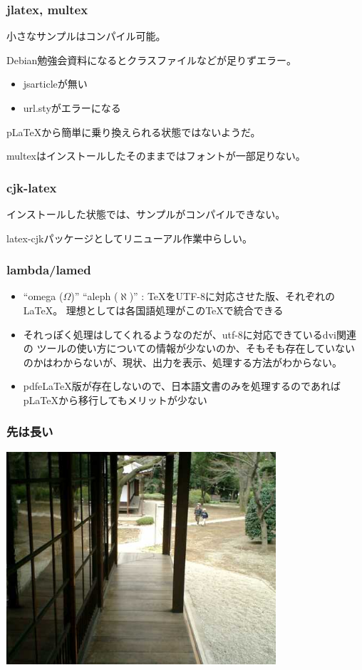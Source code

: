 \documentclass[cjk,dvipdfmx]{beamer}
\begin{document}
\begin{frame}
\frametitle{jlatex, multex}
小さなサンプルはコンパイル可能。

Debian勉強会資料になるとクラスファイルなどが足りずエラー。

\begin{itemize}
 \item jsarticleが無い
 \item url.styがエラーになる
\end{itemize}

p\LaTeX{}から簡単に乗り換えられる状態ではないようだ。

multexはインストールしたそのままではフォントが一部足りない。

\end{frame}

\begin{frame}
 \frametitle{cjk-latex}
インストールした状態では、サンプルがコンパイルできない。

latex-cjkパッケージとしてリニューアル作業中らしい。
\end{frame}

\begin{frame}
 \frametitle{lambda/lamed}
\begin{itemize}
 \item ``omega ($\Omega$)'' ``aleph ($\aleph$)'' : \TeX{}をUTF-8に対応させた版、それぞれの
       \LaTeX{}。
       理想としては各国語処理がこの\TeX{}で統合できる
 \item  それっぽく処理はしてくれるようなのだが、utf-8に対応できているdvi関連の
       ツールの使い方についての情報が少ないのか、そもそも存在していない
       のかはわからないが、現状、出力を表示、処理する方法がわからない。
 \item pdfe\LaTeX 版が存在しないので、日本語文書のみを処理するのであれば 
       p\LaTeX から移行してもメリットが少ない
\end{itemize}
\end{frame}

\begin{frame}
 \frametitle{先は長い}

\includegraphics[width=10cm]{image200604/endscene.png}

\end{frame}
\end{document}

